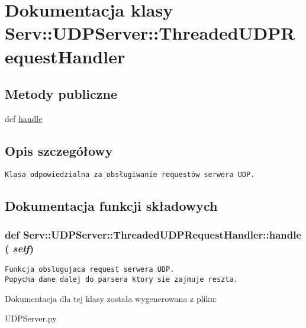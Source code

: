 \hypertarget{class_serv_1_1_u_d_p_server_1_1_threaded_u_d_p_request_handler}{
\section{Dokumentacja klasy Serv::UDPServer::ThreadedUDPRequestHandler}
\label{class_serv_1_1_u_d_p_server_1_1_threaded_u_d_p_request_handler}
}
\subsection*{Metody publiczne}
\begin{CompactItemize}
\item 
def \hyperlink{class_serv_1_1_u_d_p_server_1_1_threaded_u_d_p_request_handler_94afb499da79b188e658f8b2d4bffb9a}{handle}
\end{CompactItemize}


\subsection{Opis szczegółowy}


\footnotesize\begin{verbatim}Klasa odpowiedzialna za obsługiwanie requestów serwera UDP.\end{verbatim}
\normalsize
 

\subsection{Dokumentacja funkcji składowych}
\hypertarget{class_serv_1_1_u_d_p_server_1_1_threaded_u_d_p_request_handler_94afb499da79b188e658f8b2d4bffb9a}{
\subsubsection[{handle}]{\setlength{\rightskip}{0pt plus 5cm}def Serv::UDPServer::ThreadedUDPRequestHandler::handle ( {\em self})}}
\label{class_serv_1_1_u_d_p_server_1_1_threaded_u_d_p_request_handler_94afb499da79b188e658f8b2d4bffb9a}




\footnotesize\begin{verbatim}Funkcja obslugujaca request serwera UDP.
Popycha dane dalej do parsera ktory sie zajmuje reszta.
\end{verbatim}
\normalsize
 

Dokumentacja dla tej klasy została wygenerowana z pliku:\begin{CompactItemize}
\item 
UDPServer.py\end{CompactItemize}
